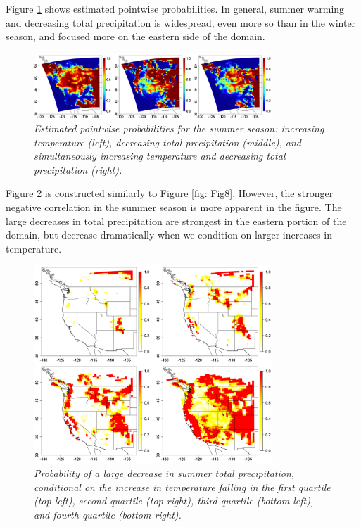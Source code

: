 \documentclass[12pt]{amsart}
\begin{document}
Figure \ref{fig: Fig12} shows estimated pointwise probabilities. In general, summer warming and decreasing total precipitation is widespread, even more so than in the winter season, and focused more on the eastern side of the domain.

\begin{figure}[H]
    \centering
    \includegraphics[width = 0.8\textwidth]{Fig12.png}
    \caption{\emph{Estimated pointwise probabilities for the summer season: increasing temperature (left), decreasing total precipitation (middle), and simultaneously increasing temperature and decreasing total precipitation (right).}}
    \label{fig: Fig12}
\end{figure}

Figure \ref{fig: Fig13} is constructed similarly to Figure \ref{fig: Fig8}. However, the stronger negative correlation in the summer season is more apparent in the figure. The large decreases in total precipitation are strongest in the eastern portion of the domain, but decrease dramatically when we condition on larger increases in temperature.

\begin{figure}[H]
    \centering
    \includegraphics[width = 0.8\textwidth]{Fig13.png}
    \caption{\emph{Probability of a large decrease in summer total precipitation, conditional on the increase in temperature falling in the first quartile (top left), second quartile (top right), third quartile (bottom left), and fourth quartile (bottom right).}}
    \label{fig: Fig13}
\end{figure}
\end{document}
